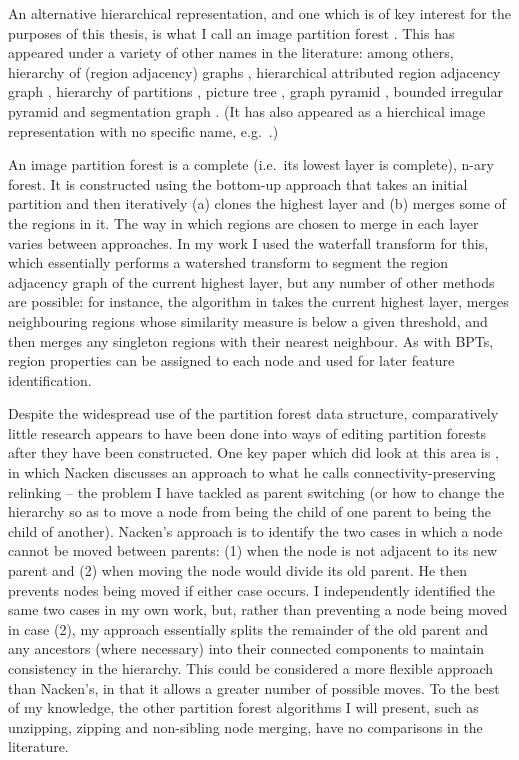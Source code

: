 An alternative hierarchical representation, and one which is of key interest for the purposes of this thesis, is what I call an image partition forest \cite{gvccimi08,gvcispa09}. This has appeared under a variety of other names in the literature: among others, hierarchy of (region adjacency) graphs \cite{kropatsch04,nacken95,shen97}, hierarchical attributed region adjacency graph \cite{fischer04}, hierarchy of partitions \cite{haxhimusa03,lezoray06}, picture tree \cite{andrade03}, graph pyramid \cite{kerren06}, bounded irregular pyramid \cite{marfil07} and segmentation graph \cite{borenstein06}. (It has also appeared as a hierchical image representation with no specific name, e.g.~\cite{qimin04,yu02}.)

An image partition forest is a complete (i.e.~its lowest layer is complete), n-ary forest. It is constructed using the bottom-up approach that takes an initial partition and then iteratively (a) clones the highest layer and (b) merges some of the regions in it. The way in which regions are chosen to merge in each layer varies between approaches. In my work I used the waterfall transform \cite{marcotegui05} for this, which essentially performs a watershed transform to segment the region adjacency graph of the current highest layer, but any number of other methods are possible: for instance, the algorithm in \cite{yu02} takes the current highest layer, merges neighbouring regions whose similarity measure is below a given threshold, and then merges any singleton regions with their nearest neighbour. As with BPTs, region properties can be assigned to each node and used for later feature identification.

Despite the widespread use of the partition forest data structure, comparatively little research appears to have been done into ways of editing partition forests after they have been constructed. One key paper which did look at this area is \cite{nacken95}, in which Nacken discusses an approach to what he calls connectivity-preserving relinking -- the problem I have tackled as parent switching (or how to change the hierarchy so as to move a node from being the child of one parent to being the child of another). Nacken's approach is to identify the two cases in which a node cannot be moved between parents: (1) when the node is not adjacent to its new parent and (2) when moving the node would divide its old parent. He then prevents nodes being moved if either case occurs. I independently identified the same two cases in my own work, but, rather than preventing a node being moved in case (2), my approach essentially splits the remainder of the old parent and any ancestors (where necessary) into their connected components to maintain consistency in the hierarchy. This could be considered a more flexible approach than Nacken's, in that it allows a greater number of possible moves. To the best of my knowledge, the other partition forest algorithms I will present, such as unzipping, zipping and non-sibling node merging, have no comparisons in the literature.

